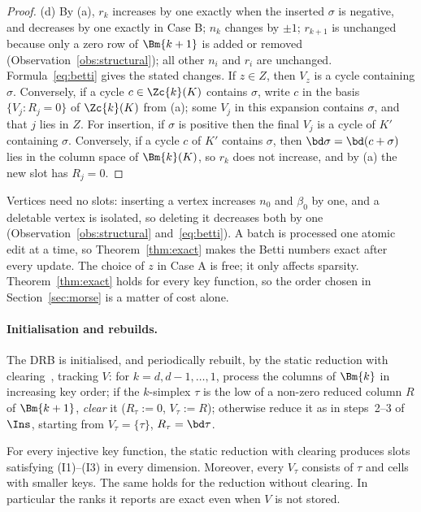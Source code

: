 \begin{proof}
(d) By (a), $r_k$ increases by one exactly when the inserted $\sigma$ is negative,
and decreases by one exactly in Case B; $n_k$ changes by $\pm1$; $r_{k+1}$ is
unchanged because only a zero row of $\Bm{k+1}$ is added or removed
(Observation~\ref{obs:structural}); all other $n_i$ and $r_i$ are unchanged.
Formula~\eqref{eq:betti} gives the stated changes. If
$z\in Z$, then $V_z$ is a cycle containing $\sigma$. Conversely, if a cycle
$c\in\Zc{k}(K)$ contains $\sigma$, write $c$ in the basis
$\{V_j:R_j=0\}$ of $\Zc{k}(K)$ from (a); some $V_j$ in this expansion contains
$\sigma$, and that $j$ lies in $Z$. For insertion, if $\sigma$ is positive then
the final $V_j$ is a cycle of $K'$ containing $\sigma$. Conversely, if a cycle
$c$ of $K'$ contains $\sigma$, then $\bd\sigma=\bd(c+\sigma)$ lies in the
column space of $\Bm{k}(K)$, so $r_k$ does not increase, and by (a) the new slot
has $R_j=0$.
\end{proof}

Vertices need no slots: inserting a vertex increases $n_0$ and $\beta_0$ by
one, and a deletable vertex is isolated, so deleting it decreases both by one
(Observation~\ref{obs:structural} and~\eqref{eq:betti}). A batch is processed
one atomic edit at a time, so Theorem~\ref{thm:exact} makes the Betti numbers
exact after every update. The choice of $z$ in Case A
is free; it only affects sparsity. Theorem~\ref{thm:exact} holds for every key
function, so the order chosen in Section~\ref{sec:morse} is a matter of cost
alone.

\paragraph{Initialisation and rebuilds.}
The DRB is initialised, and periodically rebuilt, by the static reduction with
clearing~\cite{chen2011twist}, tracking $V$: for $k=d,d-1,\dots,1$, process the
columns of $\Bm{k}$ in increasing key order; if the $k$-simplex $\tau$ is the low
of a non-zero reduced column $R$ of $\Bm{k+1}$, \emph{clear} it ($R_\tau:=0$,
$V_\tau:=R$); otherwise reduce it as in steps~2--3 of $\Ins$, starting from
$V_\tau=\{\tau\}$, $R_\tau=\bd\tau$.

\begin{subproposition}[Rebuild]\label{cor:rebuild}
For every injective key function, the static reduction with clearing produces
slots satisfying (I1)--(I3) in every dimension. Moreover, every $V_\tau$ consists
of $\tau$ and cells with smaller keys. The same holds for the reduction without
clearing. In particular the ranks it reports are exact even when $V$ is not
stored.
\end{subproposition}

